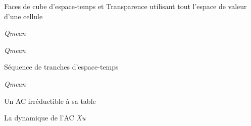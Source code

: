 \documentclass[a4paper,dvips]{slides}
\renewcommand{\arule}[1]{\emph{\mbox{#1}}} %
\newenvironment{mynote}{\begin{note}\begin{scriptsize}}{\end{scriptsize}\end{note}}
\newcommand{\mystitle}[1]{\begin{center}#1\end{center}}
\begin{document}

\begin{slide}
  \mystitle{Faces de cube d'espace-temps et Transparence utilisant
    tout l'espace de valeur d'une cellule}
  {\arule{Qmean} }
\end{slide}


\begin{slide}
  {\arule{Qmean} }
\end{slide}


\begin{slide}
  \mystitle{S\'equence de tranches d'espace-temps}
  {\arule{Qmean} }
\end{slide}


\begin{slide}
  \mystitle{Un AC irr\'eductible \`a sa table}
  {La dynamique de l'AC \arule{Xu}}%
\end{slide}
\end{document}

